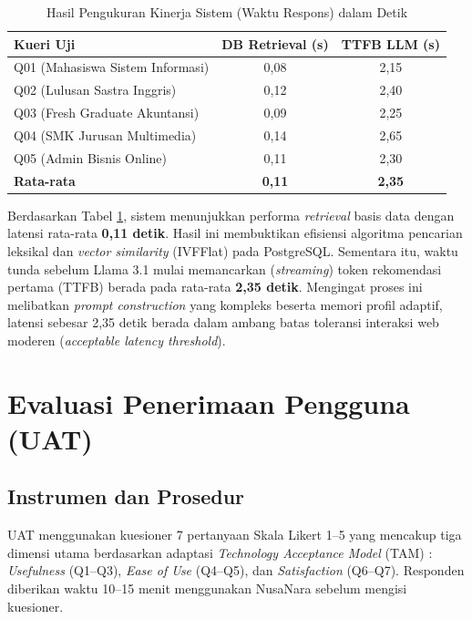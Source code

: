\begin{table}[H]
\centering
\caption{Hasil Pengukuran Kinerja Sistem (Waktu Respons) dalam Detik}
\label{tab:evaluasi_latency}
\begin{tabular}{lcc}
\toprule
\textbf{Kueri Uji} & \textbf{DB Retrieval (s)} & \textbf{TTFB LLM (s)} \\
\midrule
Q01 (Mahasiswa Sistem Informasi) & 0,08 & 2,15 \\
Q02 (Lulusan Sastra Inggris) & 0,12 & 2,40 \\
Q03 (Fresh Graduate Akuntansi) & 0,09 & 2,25 \\
Q04 (SMK Jurusan Multimedia) & 0,14 & 2,65 \\
Q05 (Admin Bisnis Online) & 0,11 & 2,30 \\
\midrule
\textbf{Rata-rata} & \textbf{0,11} & \textbf{2,35} \\
\bottomrule
\end{tabular}
\end{table}

Berdasarkan Tabel \ref{tab:evaluasi_latency}, sistem menunjukkan performa \textit{retrieval} basis data dengan latensi rata-rata \textbf{0,11 detik}. Hasil ini membuktikan efisiensi algoritma pencarian leksikal dan \textit{vector similarity} (IVFFlat) pada PostgreSQL. Sementara itu, waktu tunda sebelum Llama 3.1 mulai memancarkan (\textit{streaming}) token rekomendasi pertama (TTFB) berada pada rata-rata \textbf{2,35 detik}. Mengingat proses ini melibatkan \textit{prompt construction} yang kompleks beserta memori profil adaptif, latensi sebesar 2,35 detik berada dalam ambang batas toleransi interaksi web moderen (\textit{acceptable latency threshold}).

\section{Evaluasi Penerimaan Pengguna (UAT)}

\subsection{Instrumen dan Prosedur}
UAT menggunakan kuesioner 7 pertanyaan Skala Likert 1--5 yang mencakup tiga dimensi utama
berdasarkan adaptasi \textit{Technology Acceptance Model} (TAM) \cite{Davis1989}:
\textit{Usefulness} (Q1--Q3), \textit{Ease of Use} (Q4--Q5), dan \textit{Satisfaction} (Q6--Q7).
Responden diberikan waktu 10--15 menit menggunakan NusaNara sebelum mengisi kuesioner.

